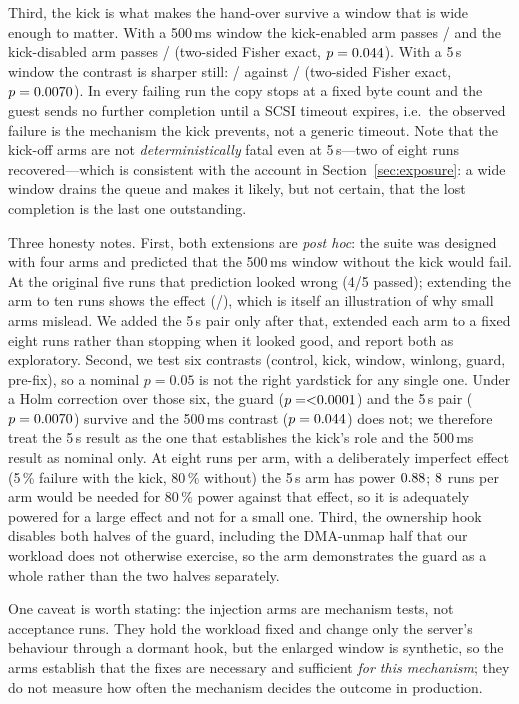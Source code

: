 \documentclass[10pt,conference]{IEEEtran}
\begin{document}
Third, the kick is what makes the hand-over survive a window that is wide enough
to matter. With a 500\,ms window the kick-enabled arm passes
\InjWindowPass/\InjWindowN{} and the kick-disabled arm passes
\InjWindowLossPass/\InjWindowLossN{} (two-sided Fisher exact, $p=0.044$). With a 5\,s window the
contrast is sharper still: \InjWinLongOnPass/\InjWinLongOnN{} against
\InjWinLongOffPass/\InjWinLongOffN{} (two-sided Fisher exact, $p=0.0070$). In every failing run
the copy stops at a fixed byte count and the guest sends no further completion
until a SCSI timeout expires, i.e.\ the observed failure is the mechanism the
kick prevents, not a generic timeout. Note that the kick-off arms are not
\emph{deterministically} fatal even at 5\,s---two of eight runs recovered---which
is consistent with the account in Section~\ref{sec:exposure}: a wide window
drains the queue and makes it likely, but not certain, that the lost completion
is the last one outstanding.

Three honesty notes. First, both extensions are \emph{post hoc}: the suite was
designed with four arms and predicted that the 500\,ms window without the kick
would fail. At the original five runs that prediction looked wrong (4/5 passed);
extending the arm to ten runs shows the effect (\InjWindowLossPass/\InjWindowLossN),
which is itself an illustration of why small arms mislead. We added the 5\,s
pair only after that, extended each arm to a fixed eight runs rather than
stopping when it looked good, and report both as exploratory. Second, we test
six contrasts (control, kick, window, winlong, guard, pre-fix), so a nominal
$p=0.05$ is not the right yardstick for any single one. Under a Holm correction
over those six, the guard ($p=\FisherGuard$) and the 5\,s pair
($p=0.0070$) survive and the 500\,ms contrast ($p=0.044$) does
not; we therefore treat the 5\,s result as the one that establishes the kick's
role and the 500\,ms result as nominal only. At eight runs per arm, with a
deliberately imperfect effect (5\,\% failure with the kick, 80\,\% without) the
5\,s arm has power $0.88$; $8$ runs per arm would be needed
for 80\,\% power against that effect, so it is adequately powered for a large
effect and not for a small one. Third, the ownership hook disables both halves
of the guard, including the DMA-unmap half that our workload does not otherwise
exercise, so the arm demonstrates the guard as a whole rather than the two
halves separately.

One caveat is worth stating: the injection arms are mechanism tests, not
acceptance runs. They hold the workload fixed and change only the server's
behaviour through a dormant hook, but the enlarged window is synthetic, so the
arms establish that the fixes are necessary and sufficient \emph{for this
mechanism}; they do not measure how often the mechanism decides the outcome in
production.
\end{document}
